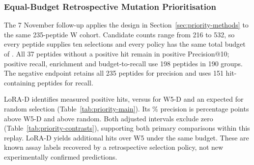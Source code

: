 \subsubsection{Equal-Budget Retrospective Mutation Prioritisation}\label{sec:res-prioritization}
The 7 November follow-up applies the design in Section~\ref{sec:priority-methods} to the same
235-peptide W cohort. Candidate counts range from 216 to 532, so every peptide supplies ten
selections and every policy has the same total budget of \nPrioritySelections{}.
All 37 peptides without a positive hit remain in positive Precision@10; positive recall,
enrichment and budget-to-recall use 198 peptides in 190 groups. The negative endpoint retains
all 235 peptides for precision and uses 151 hit-containing peptides for recall.

\begin{table}[htbp]
  \centering
  \caption[Equal-budget replay on W]{Equal-budget replay on W. P and R are peptide-macro precision and recall in percent.
  Positive recall uses 198 peptides with hits; precision uses all 235. Each policy selects
  2,350 substitutions per endpoint. Random hits are analytic expectations.}
  \label{tab:priority-main}
  
\end{table}

LoRA-D identifies \nPriorityLoraHits{} measured positive hits, versus \nPriorityWfiveHits{} for
W5-D and an expected \nPriorityRandomHits{} for random selection
(Table~\ref{tab:priority-main}). Its \nPriorityLoraPrecision\% precision is
\nPriorityDeltaWfive{} percentage points above W5-D and \nPriorityDeltaRandom{} above random.
Both adjusted intervals exclude zero (Table~\ref{tab:priority-contrasts}), supporting both
primary comparisons within this replay. LoRA-D yields \nPriorityExtraHits{} additional hits over
W5 under the same budget. These are known assay labels recovered by a retrospective selection
policy, not new experimentally confirmed predictions.

\begin{table}[htbp]
  \centering
  \caption[Primary positive Precision@10 differences, in percentage points]{Primary positive Precision@10 differences, in percentage points.
  Paired protein-group bootstrap uses 5,000 draws; 97.5\% intervals adjust the two primary contrasts.}
  \label{tab:priority-contrasts}
  
\end{table}

